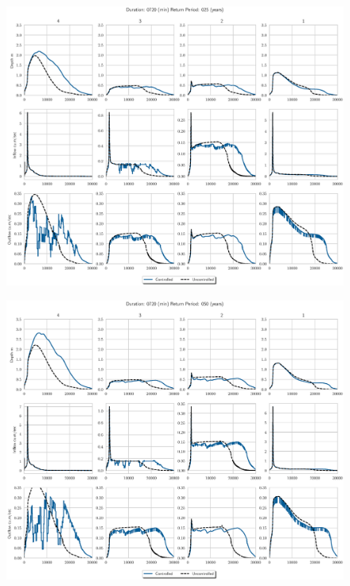 \begin{figure}
    \centering
    \includegraphics[width=\linewidth]{./RL-SI-figures/77storms/0720025.eps}
\end{figure}
\begin{figure}
    \centering
    \includegraphics[width=\linewidth]{./RL-SI-figures/77storms/0720050.eps}
\end{figure}
